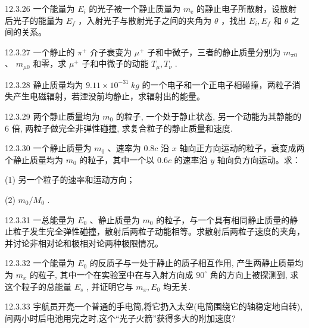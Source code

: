 \begin{problem}{12.3.26}
一个能量为 $E_{i}$ 的光子被一个静止质量为 $m_{\mathrm{e}}$ 的静止电子所散射，设散射后光子的能量为 $E_{f}$ ，入射光子与散射光子之间的夹角为 $\theta$ ，找出 $E_{i}, E_{f}$ 和 $\theta$ 之间的关系。
\end{problem}
\clearpage


\begin{problem}{12.3.27}
一个静止的 $\pi^{+}$ 介子衰变为 $\mu^{+}$ 子和中微子，三者的静止质量分别为 $m_{\pi 0}$ 、 $m_{\mu 0}$ 和零，求 $\mu^{+}$ 子和中微子的动能 $T_{\mu}, T_{\nu}$ .
\end{problem}
\clearpage


\begin{problem}{12.3.28}
静止质量均为 $9.11 \times 10^{-31} ~kg$ 的一个电子和一个正电子相碰撞，两粒子消失产生电磁辐射，若湮没前均静止，求辐射出的能量。
\end{problem}
\clearpage


\begin{problem}{12.3.29}
两个静止质量均为 $m_0$ 的粒子, 一个处于静止状态, 另一个动能为其静能的 6 倍, 两粒子做完全非弹性碰撞, 求复合粒子的静止质量和速度.
\end{problem}
\clearpage


\begin{problem}{12.3.30}
一个静止质量为 $m_0$ 、速率为 $0.8c$ 沿 $x$ 轴向正方向运动的粒子，衰变成两个静止质量均为 $m_0$ 的粒子，其中一个以 $0.6c$ 的速率沿 $y$ 轴向负方向运动。求：

(1) 另一个粒子的速率和运动方向；

(2) $m_{0}/M_{0}$ .
\end{problem}
\clearpage


\begin{problem}{12.3.31}
一总能量为 $E_0$ 、静止质量为 $m_0$ 的粒子，与一个具有相同静止质量的静止粒子发生完全弹性碰撞，散射后两粒子动能相等。求散射后两粒子速度的夹角，并讨论非相对论和极相对论两种极限情况。
\end{problem}
\clearpage


\begin{problem}{12.3.32}
一个能量为 $E_0$ 的反质子与一处于静止的质子相互作用, 产生两静止质量均为 $m_x$ 的粒子, 其中一个在实验室中在与入射方向成 $90^\circ$ 角的方向上被探测到, 求这个粒子的总能量 $E_s$ , 并证明它与 $m_x, E_0$ 均无关.
\end{problem}
\clearpage


\begin{problem}{12.3.33}
宇航员开亮一个普通的手电筒,将它扔入太空(电筒围绕它的轴稳定地自转),问两小时后电池用完之时,这个“光子火箭”获得多大的附加速度?
\end{problem}
\clearpage


